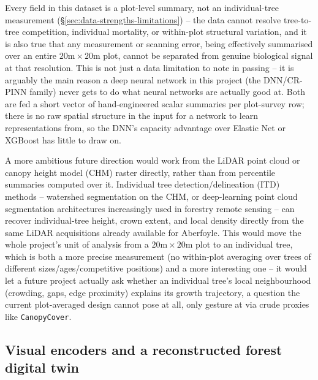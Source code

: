 Every field in this dataset is a plot-level summary, not an individual-tree measurement
(\S\ref{sec:data-strengths-limitations}) -- the data cannot resolve tree-to-tree competition,
individual mortality, or within-plot structural variation, and it is also true that any measurement
or scanning error, being effectively summarised over an entire $20\text{m}\times20\text{m}$ plot,
cannot be separated from genuine biological signal at that resolution. This is not just a data
limitation to note in passing -- it is arguably the main reason a deep neural network in this
project (the DNN/CR-PINN family) never gets to do what neural networks are actually good at.
Both are fed a short vector of hand-engineered scalar summaries per plot-survey row; there is no
raw spatial structure in the input for a network to learn representations from, so the DNN's
capacity advantage over Elastic Net or XGBoost has little to draw on.

A more ambitious future direction would work from the LiDAR point cloud or canopy height model
(CHM) raster directly, rather than from percentile summaries computed over it. Individual tree
detection/delineation (ITD) methods -- watershed segmentation on the CHM, or deep-learning point
cloud segmentation architectures increasingly used in forestry remote sensing -- can recover
individual-tree height, crown extent, and local density directly from the same LiDAR acquisitions
already available for Aberfoyle. This would move the whole project's unit of analysis from a
$20\text{m}\times20\text{m}$ plot to an individual tree, which is both a more precise measurement
(no within-plot averaging over trees of different sizes/ages/competitive positions) and a more
interesting one -- it would let a future project actually ask whether an individual tree's local
neighbourhood (crowding, gaps, edge proximity) explains its growth trajectory, a question the
current plot-averaged design cannot pose at all, only gesture at via crude proxies like
\texttt{CanopyCover}.

\subsection{Visual encoders and a reconstructed forest digital twin}
\label{sec:futurework-digital-twin}

